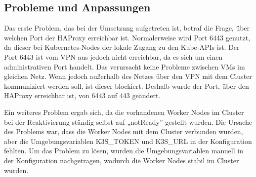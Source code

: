 \subsection{Probleme und Anpassungen}
Das erste Problem, das bei der Umsetzung aufgetreten ist, betraf die Frage, über welchen Port der HAProxy erreichbar ist.
Normalerweise wird Port 6443 genutzt, da dieser bei Kubernetes-Nodes der lokale Zugang zu den Kube-APIs ist.
Der Port 6443 ist vom VPN aus jedoch nicht erreichbar, da es sich um einen administrativen Port handelt. 
Das verursacht keine Probleme zwischen VMs im gleichen Netz. Wenn jedoch außerhalb des Netzes über den VPN mit dem Cluster kommuniziert werden soll, ist dieser blockiert.
Deshalb wurde der Port, über den HAProxy erreichbar ist, von 6443 auf 443 geändert.

Ein weiteres Problem ergab sich, da die vorhandenen Worker Nodes im Cluster bei der Reaktivierung ständig selbst auf „notReady” gestellt wurden.
Die Ursache des Problems war, dass die Worker Nodes mit dem Cluster verbunden wurden, aber die Umgebungsvariablen K3S\_TOKEN und K3S\_URL in der Konfiguration fehlten.
Um das Problem zu lösen, wurden die Umgebungsvariablen manuell in der Konfiguration nachgetragen, wodurch die Worker Nodes stabil im Cluster wurden.
